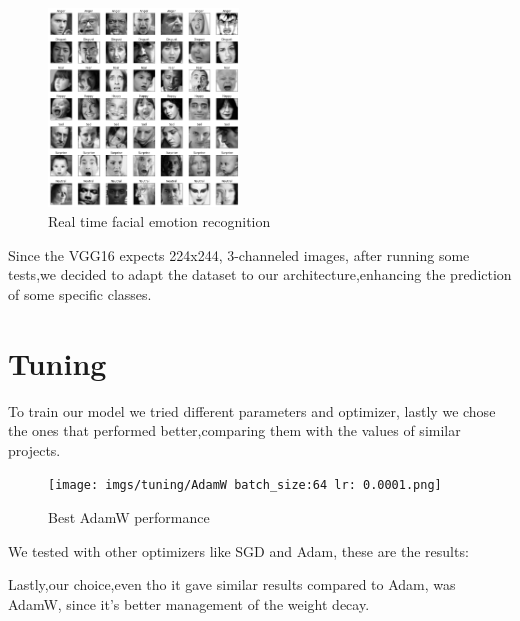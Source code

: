 \documentclass{article}
\begin{document}
\begin{figure}[htbp]

\centering
\includegraphics[width=0.45\textwidth]{imgs/dataset/dataset_img2.png}

\caption{Real time facial emotion recognition}
\label{fig:dataset_img}

\end{figure}

Since the VGG16 expects 224x244, 3-channeled images, after running some tests,we decided to adapt the dataset to our architecture,enhancing the prediction of some specific classes.


\newpage
\section{Tuning}
To train our model we tried different parameters and optimizer, lastly we chose the ones that performed better,comparing them with the values of similar projects.
\begin{figure}[htbp]

\centering
\texttt{[image: imgs/tuning/AdamW batch\_size:64 lr: 0.0001.png]}

\caption{Best AdamW performance}
\label{fig:tuning_img}

\end{figure}

We tested with other optimizers like SGD and Adam, these are the results:
\begin{figure}[htbp]
\centering
{}
\hspace{1cm}
\label{fig:tuning_img}
\end{figure}

Lastly,our choice,even tho it gave similar results compared to Adam, was AdamW, since it's better management of the weight decay.
\end{document}
